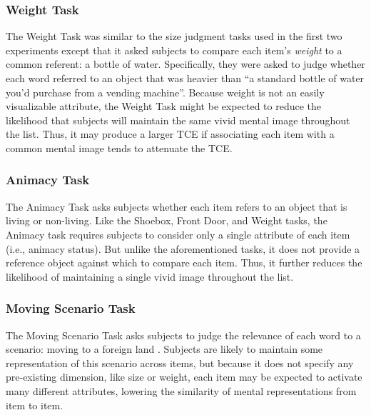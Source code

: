 \documentclass[man,natbib,floatsintext]{apa6} %
\begin{document}
\subsubsection{Weight Task} The Weight Task was similar to the size judgment tasks used in the first two experiments except that it asked subjects to compare each item's \emph{weight} to a common referent: a bottle of water. Specifically, they were asked to judge whether each word referred to an object that was heavier than ``a standard bottle of water you'd purchase from a vending machine''. Because weight is not an easily visualizable attribute, the Weight Task might be expected to reduce the likelihood that subjects will maintain the same vivid mental image throughout the list. Thus, it may produce a larger TCE if associating each item with a common mental image tends to attenuate the TCE.

\subsubsection{Animacy Task} The Animacy Task asks subjects whether each item refers to an object that is living or non-living. Like the Shoebox, Front Door, and Weight tasks, the Animacy task requires subjects to consider only a single attribute of each item (i.e., animacy status). But unlike the aforementioned tasks, it does not provide a reference object against which to compare each item. Thus, it further reduces the likelihood of maintaining a single vivid image throughout the list. 

\subsubsection{Moving Scenario Task} The Moving Scenario Task asks subjects to judge the relevance of each word to a scenario: moving to a foreign land \citep{NairEtal17}. Subjects are likely to maintain some representation of this scenario across items, but because it does not specify any pre-existing dimension, like size or weight, each item may be expected to activate many different attributes, lowering the similarity of mental representations from item to item.
\end{document}
